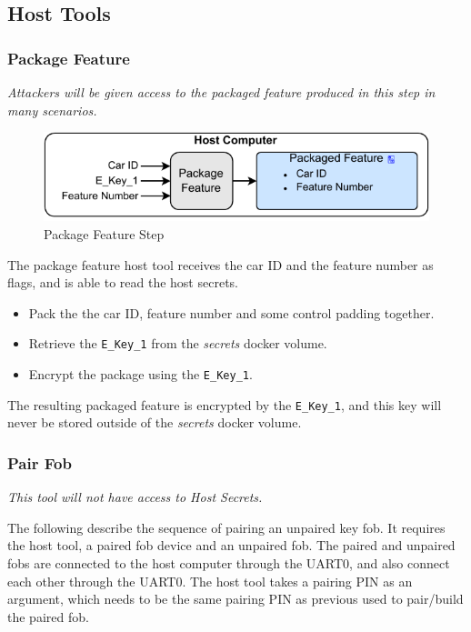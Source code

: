 \documentclass[11pt,oneside,onecolumn,letterpaper]{article}
\begin{document}
\subsection{Host Tools}

\subsubsection{Package Feature}

\textit{Attackers will be given access to the packaged feature produced in this step in many scenarios.}

\begin{figure}[!htbp]
	\begin{centering}
		\includegraphics[width = .6\textwidth]{pic/package_feature.pdf}
		\caption{Package Feature Step}
		\label{fig:package_feature}
	\end{centering}
\end{figure}

The package feature host tool receives the car ID and the feature number as flags, and is able to read the host secrets.
\begin{itemize}
	\item Pack the the car ID, feature number and some control padding together.
	\item Retrieve the \verb|E_Key_1| from the \textit{secrets} docker volume.
	\item Encrypt the package using the \verb|E_Key_1|.
\end{itemize}

The resulting packaged feature is encrypted by the \verb|E_Key_1|, and this key will never be stored outside of the \textit{secrets} docker volume.

\subsubsection{Pair Fob}

\textit{This tool will not have access to Host Secrets.}

The following describe the sequence of pairing an unpaired key fob. It requires the host tool, a paired fob device and an unpaired fob. The paired and unpaired fobs are connected to the host computer through the UART0, and also connect each other through the UART0. The host tool takes a pairing PIN as an argument, which needs to be the same pairing PIN as previous used to pair/build the paired fob.
\end{document}
